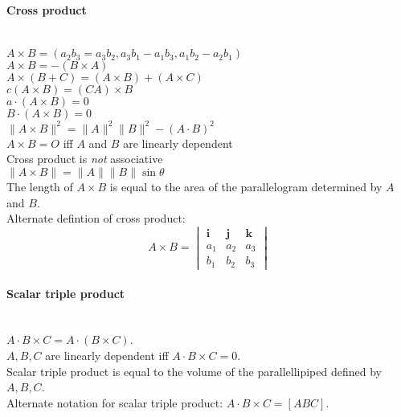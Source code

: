 \documentclass[10pt]{article}
\begin{document}
\paragraph{Cross product}\ \\
$A \times B = (a_2b_3=a_3b_2, a_3b_1-a_1b_3, a_1b_2-a_2b_1)$\\
$A\times B = -(B\times A)$\\
$A\times (B+C) = (A\times B)+(A\times C)$\\
$c(A\times B) = (CA) \times B$\\
$a\cdot(A\times B)= 0$\\
$B\cdot(A\times B)=0$\\
$\lVert A\times B\rVert^2=\lVert A\rVert^2\lVert B\rVert^2 - (A\cdot B)^2$\\
$A\times B = O$ iff $A$ and $B$ are linearly dependent\\
Cross product is {\it not} associative\\
$\lVert A\times B\rVert = \lVert A\rVert \lVert B\rVert \sin \theta$\\
The length of $A \times B$ is equal to the area of the parallelogram determined by $A$ and $B$.\\
Alternate defintion of cross product:
\begin{equation*}
A\times B = \begin{vmatrix}\boldsymbol{i}&\boldsymbol{j}&\boldsymbol{k}\\a_1&a_2&a_3\\b_1&b_2&b_3\end{vmatrix}
\end{equation*}

\paragraph{Scalar triple product}\ \\
$A\cdot B\times C = A\cdot (B\times C)$.\\
$A, B, C$ are linearly dependent iff $A\cdot B\times C = 0$.\\
Scalar triple product is equal to the volume of the parallellipiped defined by $A, B, C$.\\
Alternate notation for scalar triple product: $A\cdot B\times C = [ABC]$.
\end{document}
